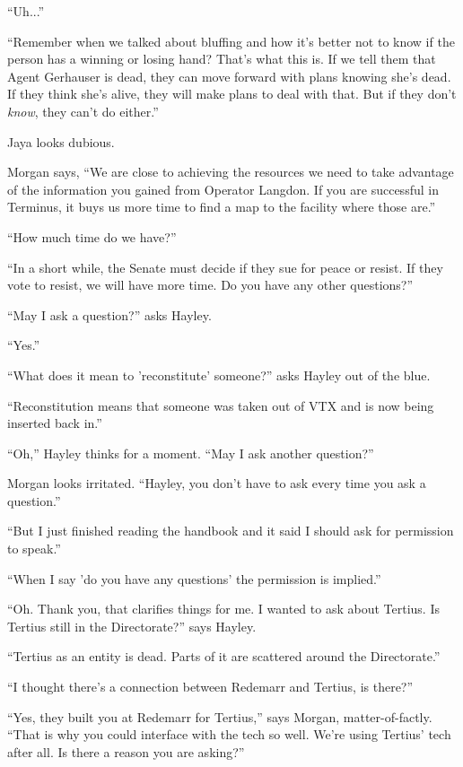 ``Uh...''

``Remember when we talked about bluffing and how it's better not to know if the person has a winning or losing hand?  That's what this is.  If we tell them that Agent Gerhauser is dead, they can move forward with plans knowing she's dead.  If they think she's alive, they will make plans to deal with that. But if they don't \textit{know}, they can't do either.''

Jaya looks dubious.

Morgan says, ``We are close to achieving the resources we need to take advantage of the information you gained from Operator Langdon.  If you are successful in Terminus, it buys us more time to find a map to the facility where those are.''

``How much time do we have?''

``In a short while, the Senate must decide if they sue for peace or resist.  If they vote to resist, we will have more time.  Do you have any other questions?''

``May I ask a question?'' asks Hayley.

``Yes.''

``What does it mean to 'reconstitute' someone?'' asks Hayley out of the blue.

``Reconstitution means that someone was taken out of VTX and is now being inserted back in.'' 

``Oh,''  Hayley thinks for a moment.  ``May I ask another question?''

Morgan looks irritated.  ``Hayley, you don't have to ask every time you ask a question.''

``But I just finished reading the handbook and it said I should ask for permission to speak.''

``When I say 'do you have any questions' the permission is implied.''

``Oh.  Thank you, that clarifies things for me.  I wanted to ask about Tertius.  Is Tertius still in the Directorate?'' says Hayley.

``Tertius as an entity is dead.  Parts of it are scattered around the Directorate.''

``I thought there's a connection between Redemarr and Tertius, is there?''

``Yes, they built you at Redemarr for Tertius,'' says Morgan, matter-of-factly.  ``That is why you could interface with the tech so well.  We're using Tertius' tech after all.  Is there a reason you are asking?''

